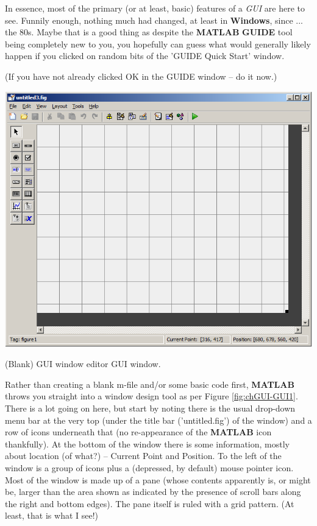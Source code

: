 \documentclass{tufte-book} %
\begin{document}
In essence, most of the primary (or at least, basic) features of a \textit{GUI} are here to see. Funnily enough, nothing much had changed, at least in \textbf{Windows}, since ... the 80s. Maybe that is a good thing as despite the \textbf{MATLAB} \textbf{GUIDE} tool being completely new to you, you hopefully can guess what would generally likely happen if you clicked on random bits of the '\textsf{GUIDE Quick Start}' window.

(If you have not already clicked \textsf{OK} in the GUIDE window -- do it now.)

\begin{marginfigure}[0.0in]
\includegraphics[width=\linewidth]{chGUI-GUI1.png}
\caption{(Blank) GUI window editor GUI window.}
\label{fig:chGUI-GUI1}
\end{marginfigure}

Rather than creating a blank \textsf{m-file} and/or some basic code first, \textbf{MATLAB}  throws you straight into a window design tool as per Figure \ref{fig:chGUI-GUI1}. There is a lot going on here, but start by noting there is the usual drop-down menu bar at the very top (under the title bar ('\textsf{untitled.fig}') of the window) and a row of icons underneath that (no re-appearance of the \textbf{MATLAB} icon thankfully). At the bottom of the window there is some information, mostly about location (of what?) -- \textsf{Current Point }and \textsf{Position}. To the left of the window is a group of icons plus a (depressed, by default) mouse pointer icon. Most of the window is made up of a pane (whose contents apparently is, or might be, larger than the area shown as indicated by the presence of scroll bars along the right and bottom edges). The pane itself is ruled with a grid pattern. (At least, that is what I see!)
\end{document}
